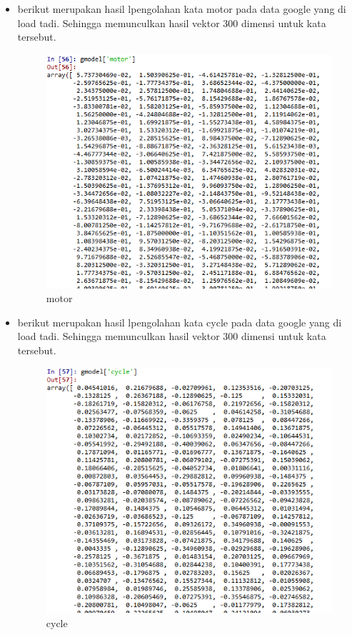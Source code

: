 \begin{enumerate}
\begin{itemize}
				\item berikut merupakan hasil lpengolahan kata motor pada data google yang di load tadi. Sehingga memunculkan hasil vektor 300 dimensi untuk kata tersebut.
	  			\begin{figure}[H]
					\centering
					\includegraphics[scale=0.4]{figures/1174057/chapter5/motor.PNG}
					\caption{motor}
					\label{motor}
				\end{figure}

				\item berikut merupakan hasil lpengolahan kata cycle pada data google yang di load tadi. Sehingga memunculkan hasil vektor 300 dimensi untuk kata tersebut.
	  			\begin{figure}[H]
					\centering
					\includegraphics[scale=0.4]{figures/1174057/chapter5/cycle.PNG}
					\caption{cycle}
					\label{cycle}
				\end{figure}


\end{itemize}
\end{enumerate}
